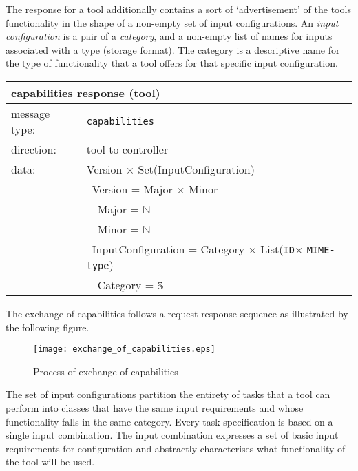 \documentclass{article}
\newcommand{\msg}[1]{\texttt{#1}}
\newcommand{\String}{\ensuremath \mathbb{S}\xspace}
\newcommand{\Id}{\texttt{ID}\xspace}
\newcommand{\MIMEtype}{\texttt{MIME-type}\xspace}
\begin{document}
   \noindent The response for a tool additionally contains a sort of
   `advertisement' of the tools functionality in the shape of a non-empty set
   of input configurations.  An \textit{input configuration} is a pair of a
   \textit{category}, and a non-empty list of names for inputs associated with
   a type (storage format).  The category is a descriptive name for the type of
   functionality that a tool offers for that specific input configuration.
   
   \begin{table}[H]
    \begin{center}
     \begin{tabular}{|ll|}
      \hline
       \multicolumn{2}{|l|}{\textbf{capabilities response (tool)}} \\
      \hline
       message type:   & \msg{capabilities} \\
      \hline
       direction:      & tool to controller \\
      \hline
       data:           & Version $\times$ Set(InputConfiguration) \\
                       & \ Version = Major $\times$ Minor \\
                       & \ \ Major = $\mathbb{N}$ \\
                       & \ \ Minor = $\mathbb{N}$ \\
                       & \ InputConfiguration = Category $\times$ List(\Id $\times$ \MIMEtype) \\
                       & \ \ Category = $\String$ \\
      \hline
     \end{tabular}
    \end{center}
    \vspace{-0.5cm}
   \end{table}

   \noindent The exchange of capabilities follows a request-response sequence
   as illustrated by the following figure.
   
   \begin{figure}[H]
    \vspace{-0.4cm}
    \begin{center}
     \texttt{[image: exchange\_of\_capabilities.eps]}
    \end{center}
    \vspace{-0.7cm}
    \caption{Process of exchange of capabilities}
   \end{figure}

   \noindent The set of input configurations partition the entirety of tasks
   that a tool can perform into classes that have the same input requirements
   and whose functionality falls in the same category. Every task specification
   is based on a single input combination. The input combination expresses a
   set of basic input requirements for configuration and abstractly
   characterises what functionality of the tool will be used.
   
\end{document}
